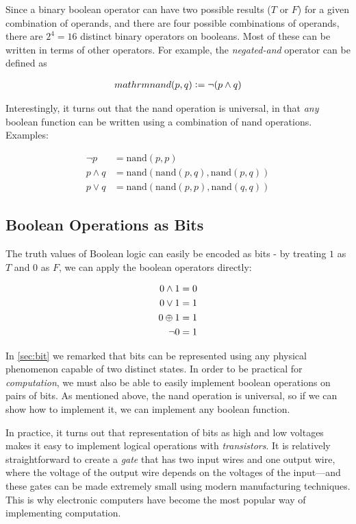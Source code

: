Since a binary boolean operator can have two possible results ($T$ or
$F$) for a given combination of operands, and there are four possible
combinations of operands, there are $2^{4}=16$ distinct binary
operators on booleans.  Most of these can be written in terms of other
operators.  For example, the \emph{negated-and} operator can be defined as

\begin{align}
  mathrm{nand}(p,q) \vcentcolon= \neg (p \land q)
\end{align}

Interestingly, it turns out that the nand operation is universal, in
that \emph{any} boolean function can be written using a combination of
nand operations.  Examples:

\begin{align}
  \neg p &= \mathrm{nand}(p,p) \\
  p \land q &= \mathrm{nand}(\mathrm{nand}(p,q),\mathrm{nand}(p,q)) \\
  p \lor q &= \mathrm{nand}(\mathrm{nand}(p,p),\mathrm{nand}(q,q))
\end{align}

\subsection{Boolean Operations as Bits}

The truth values of Boolean logic can easily be encoded as bits - by
treating $1$ as $T$ and $0$ as $F$, we can apply the boolean operators
directly:

\begin{align}
  0 \land 1 &= 0 \\
  0 \lor 1 &= 1 \\
  0 \oplus 1 &= 1 \\
  \neg 0 &= 1
\end{align}

In \cref{sec:bit} we remarked that bits can be represented using any
physical phenomenon capable of two distinct states.  In order to be
practical for \emph{computation}, we must also be able to easily
implement boolean operations on pairs of bits.  As mentioned above,
the nand operation is universal, so if we can show how to implement
it, we can implement any boolean function.

In practice, it turns out that representation of bits as high and low
voltages makes it easy to implement logical operations with
\emph{transistors}.  It is relatively straightforward to create a
\emph{gate} that has two input wires and one output wire, where the
voltage of the output wire depends on the voltages of the input---and
these gates can be made extremely small using modern manufacturing
techniques.  This is why electronic computers have become the most
popular way of implementing computation.

